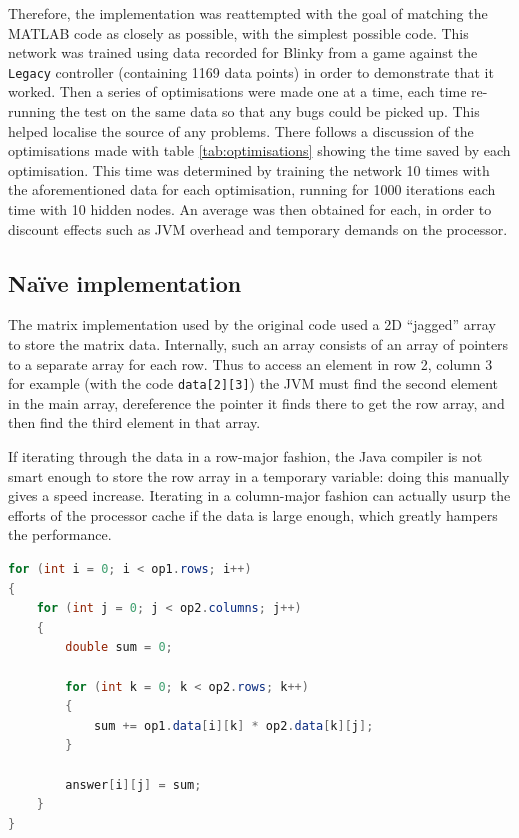 Therefore, the implementation was reattempted with the goal of matching the MATLAB code as closely as possible, with the simplest possible code.  This network was trained using data recorded for Blinky from a game against the {\tt Legacy} controller (containing 1169 data points) in order to demonstrate that it worked.  Then a series of optimisations were made one at a time, each time re-running the test on the same data so that any bugs could be picked up.  This helped localise the source of any problems.  There follows a discussion of the optimisations made with table \ref{tab:optimisations} showing the time saved by each optimisation.  This time was determined by training the network 10 times with the aforementioned data for each optimisation, running for 1000 iterations each time with 10 hidden nodes.  An average was then obtained for each, in order to discount effects such as JVM overhead and temporary demands on the processor.

\subsection{Na\"{i}ve implementation}

The matrix implementation used by the original code used a 2D ``jagged'' array to store the matrix data.  Internally, such an array consists of an array of pointers to a separate array for each row.  Thus to access an element in row 2, column 3 for example (with the code {\tt data[2][3]}) the JVM must find the second element in the main array, dereference the pointer it finds there to get the row array, and then find the third element in that array.

If iterating through the data in a row-major fashion, the Java compiler is not smart enough to store the row array in a temporary variable: doing this manually gives a speed increase.  Iterating in a column-major fashion can actually usurp the efforts of the processor cache if the data is large enough, which greatly hampers the performance.

\begin{lstlisting}[language=java,caption={Multiply code},captionpos=b,label=lst:naive,float]
for (int i = 0; i < op1.rows; i++)
{
    for (int j = 0; j < op2.columns; j++)
    {
        double sum = 0;

        for (int k = 0; k < op2.rows; k++)
        {
            sum += op1.data[i][k] * op2.data[k][j];
        }

        answer[i][j] = sum;
    }
}
\end{lstlisting}

